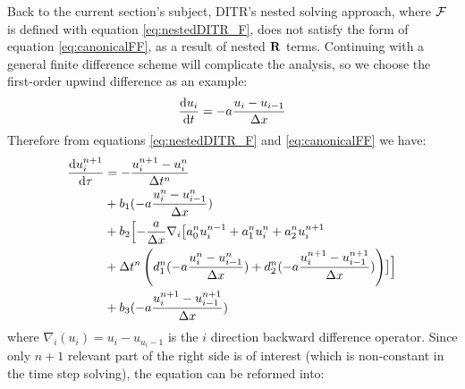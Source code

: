 \documentclass[preprint,12pt]{elsarticle}
\begin{document}
Back to the current section's subject,
DITR's nested solving approach,
where $\mathcal{F}$ is defined with equation \eqref{eq:nestedDITR_F},
does not satisfy the form of equation \eqref{eq:canonicalFF},
as a result of nested $\mathbf{R}$ terms.
Continuing with a general finite difference scheme will
complicate the analysis, so we choose the first-order
upwind difference as an example:
\begin{equation}
    \derivative{u_i}{t} = -a \frac{u_i - u_{i-1}}{\inc x}
    \label{eq:fdup1}
\end{equation}
Therefore from equations \eqref{eq:nestedDITR_F} and \eqref{eq:canonicalFF} we have:
\begin{equation}
    \begin{aligned}
        \frac{\dd u_i^{n+1}}{\dd \tau} & =
        -\frac{u_i^{n+1} - u_i^{n}}{\mathrm\Delta t^n}      \\
                                       & +
        b_1 (-a\frac{u_i^{n}-u_{i-1}^{n}}{\mathrm\Delta x}) \\
                                       & +
        b_2 \Bigl[-\frac{a}{\mathrm\Delta x} \nabla_i
        \bigl[
        a^n_0u^{n - 1}_i +
        a^n_1u^{n}_i +
        a^n_2u^{n + 1}_i                           \\
                                       & +
        \mathrm\Delta t^n
        \left(
        d^n_1(-a\frac{u_i^{n}-u_{i-1}^{n}}{\mathrm\Delta x}) +
        d^n_2(-a\frac{u_i^{n+1}-u_{i-1}^{n+1}}{\mathrm\Delta x})
        \right)\bigr]  \Bigr]                      \\
                                       & +
        b_3 (-a\frac{u_i^{n+1}-u_{i-1}^{n+1}}{\mathrm\Delta x})
        \label{eq:nestedDITR_F1}
    \end{aligned}
\end{equation}
where $\nabla_i(u_i) = u_i - u_{u_i-1}$ is the $i$ direction
backward difference operator.
Since only $n+1$ relevant part of
the right side is of interest (which is non-constant in
the time step solving), the equation \cite{eq:nestedDITR_F1} can be reformed into:
\end{document}
